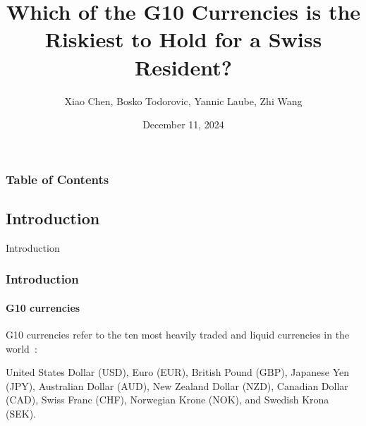\documentclass[10pt]{beamer}
\author{Xiao Chen, Bosko Todorovic, Yannic Laube, Zhi Wang}
\title{Which of the G10 Currencies is the Riskiest to Hold for a Swiss Resident?}
\institute{University of Zurich}
\date{December 11, 2024}
\begin{document}
\begin{frame}
\titlepage
\end{frame}
\begin{frame}
\frametitle{Table of Contents}
\tableofcontents
\end{frame}
\begin{frame}
\section{Introduction}
\centering \LARGE Introduction
\end{frame}
\begin{frame}
\frametitle{Introduction}
\framesubtitle{G10 currencies}
G10 currencies refer to the ten most heavily traded and liquid currencies in the world~\cite{bis2022report}: 

United States Dollar (USD), Euro (EUR), British Pound (GBP), Japanese Yen (JPY), Australian Dollar (AUD), New Zealand Dollar (NZD), Canadian Dollar (CAD), Swiss Franc (CHF), Norwegian Krone (NOK), and Swedish Krona (SEK).

\end{frame}
\end{document}
